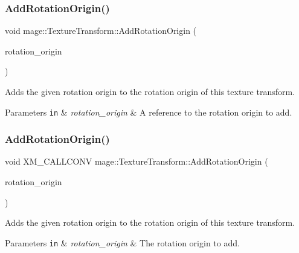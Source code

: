 \subsubsection{\texorpdfstring{Add\+Rotation\+Origin()}{AddRotationOrigin()}\hspace{0.1cm}{\footnotesize\ttfamily [2/3]}}
{\footnotesize\ttfamily void mage\+::\+Texture\+Transform\+::\+Add\+Rotation\+Origin (\begin{DoxyParamCaption}\item[{const \mbox{\hyperlink{namespacemage_aee4759dedc8def6c6dec26b5c7eddf29}{F32x2}} \&}]{rotation\+\_\+origin }\end{DoxyParamCaption})\hspace{0.3cm}{\ttfamily [noexcept]}}

Adds the given rotation origin to the rotation origin of this texture transform.


\begin{DoxyParams}[1]{Parameters}
\mbox{\tt in}  & {\em rotation\+\_\+origin} & A reference to the rotation origin to add. \\
\hline
\end{DoxyParams}
\mbox{\label{classmage_1_1_texture_transform_a67e287acb98ea8aeeda4e3466859c8b6}} 
\subsubsection{\texorpdfstring{Add\+Rotation\+Origin()}{AddRotationOrigin()}\hspace{0.1cm}{\footnotesize\ttfamily [3/3]}}
{\footnotesize\ttfamily void X\+M\+\_\+\+C\+A\+L\+L\+C\+O\+NV mage\+::\+Texture\+Transform\+::\+Add\+Rotation\+Origin (\begin{DoxyParamCaption}\item[{F\+X\+M\+V\+E\+C\+T\+OR}]{rotation\+\_\+origin }\end{DoxyParamCaption})\hspace{0.3cm}{\ttfamily [noexcept]}}

Adds the given rotation origin to the rotation origin of this texture transform.


\begin{DoxyParams}[1]{Parameters}
\mbox{\tt in}  & {\em rotation\+\_\+origin} & The rotation origin to add. \\
\hline
\end{DoxyParams}
\mbox{\label{classmage_1_1_texture_transform_a591aacd1662da3de581d440d921a99df}} 
